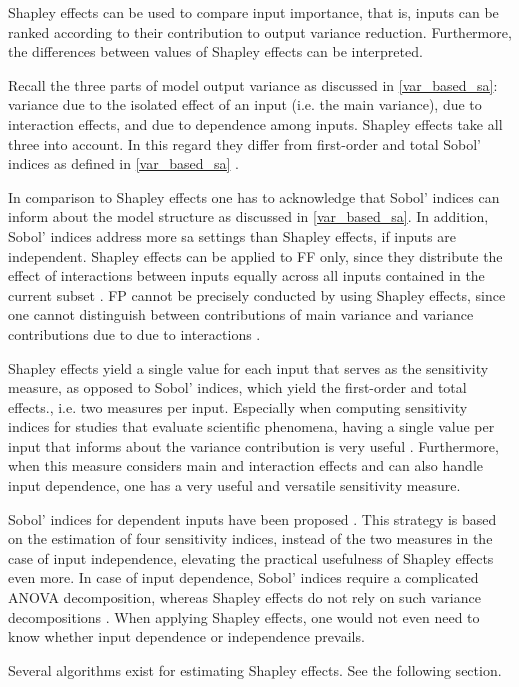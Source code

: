 Shapley effects can be used to compare input importance, that is, inputs can be ranked according to their contribution to output variance reduction. Furthermore, the differences between values of Shapley effects can be interpreted.

Recall the three parts of model output variance as discussed in \cref{var_based_sa}: variance due to the isolated effect of an input (i.e. the main variance), due to interaction effects, and due to dependence among inputs. Shapley effects take all three into account. In this regard they differ from first-order and total Sobol' indices as defined in \cref{var_based_sa} \citep{O14}.

In comparison to Shapley effects one has to acknowledge that Sobol' indices can inform about the model structure as discussed in \cref{var_based_sa}. In addition, Sobol' indices address more sa settings than Shapley effects, if inputs are independent. Shapley effects can be applied to FF only, since they distribute the effect of interactions between inputs equally across all inputs contained in the current subset \citep{IP19}. FP cannot be precisely conducted by using Shapley effects, since one cannot distinguish between contributions of main variance and variance contributions due to due to interactions \citep{IP19}.

Shapley effects yield a single value for each input that serves as the sensitivity measure, as opposed to Sobol' indices, which yield the first-order and total effects., i.e. two measures per input. Especially when computing sensitivity indices for studies that evaluate scientific phenomena, having a single value per input that informs about the variance contribution is very useful \citep{SNS16}. Furthermore, when this measure considers main and interaction effects and can also handle input dependence, one has a very useful and versatile sensitivity measure.

Sobol' indices for dependent inputs have been proposed \citep{MTA15}. This strategy is based on the estimation of four sensitivity indices, instead of the two measures in the case of input independence, elevating the practical usefulness of Shapley effects even more. In case of input dependence, Sobol' indices require a complicated ANOVA decomposition, whereas Shapley effects do not rely on such variance decompositions \citep{IP19}. When applying Shapley effects, one would not even need to know whether input dependence or independence prevails.

Several algorithms exist for estimating Shapley effects. See the following section.

